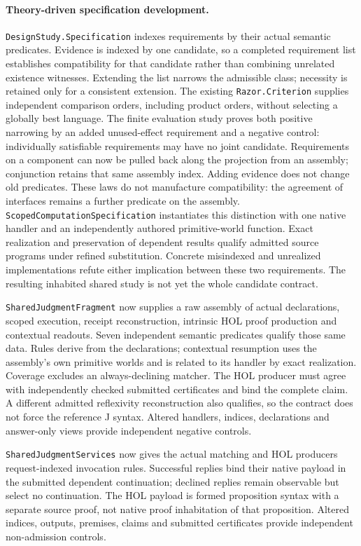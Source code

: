 \documentclass[11pt]{article}
\theoremstyle{definition}
\theoremstyle{remark}
\begin{document}
\paragraph{Theory-driven specification development.}
\texttt{DesignStudy.Specification} indexes requirements by their actual
semantic predicates. Evidence is indexed by one candidate, so a completed
requirement list establishes compatibility for that candidate rather than
combining unrelated existence witnesses. Extending the list narrows the
admissible class; necessity is retained only for a consistent extension.
The existing \texttt{Razor.Criterion} supplies independent comparison orders,
including product orders, without selecting a globally best language.
The finite evaluation study proves both positive narrowing by an added
unused-effect requirement and a negative control: individually satisfiable
requirements may have no joint candidate.
Requirements on a component can now be pulled back along the projection from
an assembly; conjunction retains that same assembly index. Adding evidence
does not change old predicates. These laws do not manufacture compatibility:
the agreement of interfaces remains a further predicate on the assembly.
\texttt{ScopedComputationSpecification} instantiates this distinction with
one native handler and an independently authored primitive-world function.
Exact realization and preservation of dependent results qualify admitted
source programs under refined substitution. Concrete misindexed and
unrealized implementations refute either implication between these two
requirements. The resulting inhabited shared study is not yet the whole
candidate contract.

\texttt{SharedJudgmentFragment} now supplies a raw assembly of actual
declarations, scoped execution, receipt reconstruction, intrinsic HOL proof
production and contextual readouts. Seven independent semantic predicates
qualify those same data. Rules derive from the declarations; contextual
resumption uses the assembly's own primitive worlds and is related to its
handler by exact realization. Coverage excludes an always-declining matcher.
The HOL producer must agree with independently checked submitted certificates
and bind the complete claim. A different admitted reflexivity reconstruction
also qualifies, so the contract does not force the reference J syntax.
Altered handlers, indices, declarations and answer-only views provide
independent negative controls.

\texttt{SharedJudgmentServices} now gives the actual matching and HOL
producers request-indexed invocation rules. Successful replies bind their
native payload in the submitted dependent continuation; declined replies
remain observable but select no continuation. The HOL payload is formed
proposition syntax with a separate source proof, not native proof inhabitation
of that proposition. Altered indices, outputs, premises, claims and submitted
certificates provide independent non-admission controls.
\end{document}
